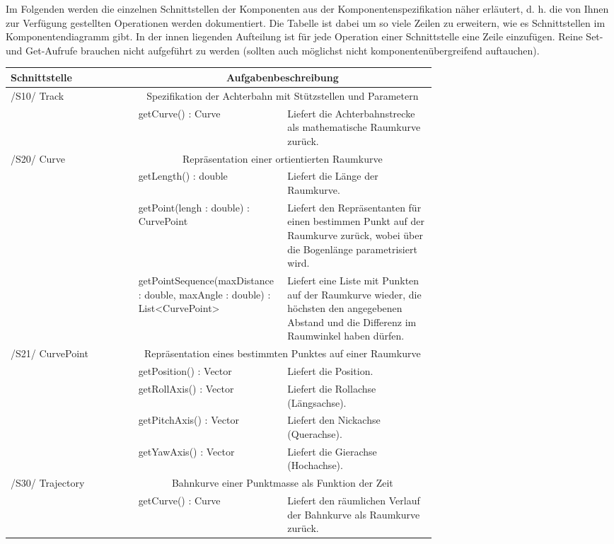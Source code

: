 Im Folgenden werden die einzelnen Schnittstellen der Komponenten aus der
Komponentenspezifikation näher erläutert, d. h. die von Ihnen zur Verfügung
gestellten Operationen werden dokumentiert. Die Tabelle ist dabei um so viele
Zeilen zu erweitern, wie es Schnittstellen im Komponentendiagramm gibt. In der
innen liegenden Aufteilung ist für jede Operation einer Schnittstelle eine
Zeile einzufügen.  Reine Set- und Get-Aufrufe brauchen nicht aufgeführt zu
werden (sollten auch möglichst nicht komponentenübergreifend auftauchen).

\begin{tabular}[ht]{|l|p{0.35\linewidth}|p{0.35\linewidth}|}
 \hline
 Schnittstelle & \multicolumn{2}{|c|}{Aufgabenbeschreibung}\\
 \hline
 \hline
    /S10/ Track & \multicolumn{2}{|c|}{Spezifikation der Achterbahn mit Stützstellen und Parametern}\\
 \hline
 & getCurve() : Curve & Liefert die Achterbahnstrecke als mathematische Raumkurve zurück.\\ 
 \hline
    /S20/ Curve & \multicolumn{2}{|c|}{Repräsentation einer ortientierten Raumkurve}\\
 \hline
 & getLength() : double & Liefert die Länge der Raumkurve.\\ 
 & getPoint(lengh : double) : CurvePoint & Liefert den Repräsentanten für einen bestimmen Punkt auf der Raumkurve zurück,
 wobei über die Bogenlänge parametrisiert wird.\\ 
 & getPointSequence(maxDistance : double, maxAngle : double) : List<CurvePoint> &
 	Liefert eine Liste mit Punkten auf der Raumkurve wieder, die höchsten den angegebenen Abstand und die
 	Differenz im Raumwinkel haben dürfen. \\
 \hline
    /S21/ CurvePoint & \multicolumn{2}{|c|}{Repräsentation eines bestimmten Punktes auf einer Raumkurve}\\
 \hline
 & getPosition() : Vector & Liefert die Position. \\
 & getRollAxis() : Vector & Liefert die Rollachse (Längsachse).\\ 
 & getPitchAxis() : Vector & Liefert den Nickachse (Querachse). \\ 
 & getYawAxis() : Vector & Liefert die Gierachse (Hochachse). \\
 \hline
 	/S30/ Trajectory & \multicolumn{2}{|c|}{Bahnkurve einer Punktmasse als Funktion der Zeit}\\
 \hline
 & getCurve() : Curve & Liefert den räumlichen Verlauf der Bahnkurve als Raumkurve zurück.\\ 

\end{tabular}

